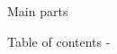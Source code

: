 %
%


\begin{frame}[t]{Main parts}

\setcounter{tocdepth}{1}
\tableofcontents
\end{frame}


\begin{frame}[allowframebreaks,t]{Table of contents -}

\setcounter{tocdepth}{3}
\setcounter{secnumdepth}{2}
\tableofcontents

\end{frame}

